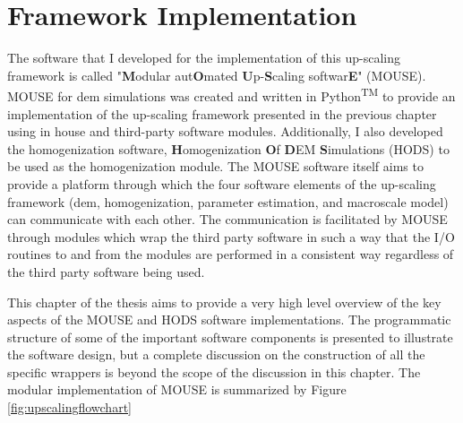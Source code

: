 \chapter{Framework Implementation}

The software that I developed for the implementation of this up-scaling framework is called "\textbf{M}odular aut\textbf{O}mated \textbf{U}p-\textbf{S}caling softwar\textbf{E}" (MOUSE). MOUSE for \acrshort{dem} simulations was created and written in Python\textsuperscript{TM} to provide an implementation of the up-scaling framework presented in the previous chapter using in house and third-party software modules. Additionally, I also developed the homogenization software, \textbf{H}omogenization \textbf{O}f \textbf{D}EM \textbf{S}imulations (HODS) to be used as the homogenization module. The MOUSE software itself aims to provide a platform through which the four software elements of the up-scaling framework (\acrshort{dem}, homogenization, parameter estimation, and macroscale model) can communicate with each other. The communication is facilitated by MOUSE through modules which wrap the third party software in such a way that the I/O routines to and from the modules are performed in a consistent way regardless of the third party software being used. 

This chapter of the thesis aims to provide a very high level overview of the key aspects of the MOUSE and HODS software implementations. The programmatic structure of some of the important software components is presented to illustrate the software design, but a complete discussion on the construction of all the specific wrappers is beyond the scope of the discussion in this chapter. The modular implementation of MOUSE is summarized by Figure \ref{fig:upscalingflowchart}


